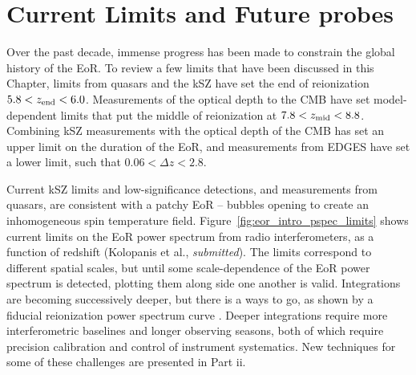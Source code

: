 \section{Current Limits and Future probes}
\label{sec:eor_intro_future}

Over the past decade, immense progress has been made to constrain the global history of the EoR. To review a few limits that have been discussed in this Chapter, limits from quasars and the kSZ have set the end of reionization $5.8 < z_{\rm end} < 6.0$. Measurements of the optical depth to the CMB have set model-dependent limits that put the middle of reionization at $7.8 < z_{\rm mid} < 8.8$. Combining kSZ measurements with the optical depth of the CMB has set an upper limit on the duration of the EoR, and measurements from EDGES have set a lower limit, such that $0.06 < \Delta z < 2.8$.

Current kSZ limits and low-significance detections, and measurements from quasars, are consistent with a patchy EoR -- bubbles opening to create an inhomogeneous spin temperature field. Figure~\ref{fig:eor_intro_pspec_limits} shows current limits on the EoR power spectrum from radio interferometers, as a function of redshift (Kolopanis et al., \textit{submitted}). The limits correspond to different spatial scales, but until some scale-dependence of the EoR power spectrum is detected, plotting them along side one another is valid. Integrations are becoming successively deeper, but there is a ways to go, as shown by a fiducial reionization power spectrum curve \citep{Mesinger.11}. Deeper integrations require more interferometric baselines and longer observing seasons, both of which require precision calibration and control of instrument systematics. New techniques for some of these challenges are presented in Part {\sc ii}.

